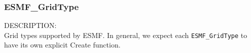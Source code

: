 % 
% 
% 
% 


 \subsubsection{ESMF\_GridType}
 
 {\sf DESCRIPTION:\\}
 Grid types supported by ESMF.  In general, we expect each {\tt ESMF\_GridType}
 to have its own explicit Create function.
 
